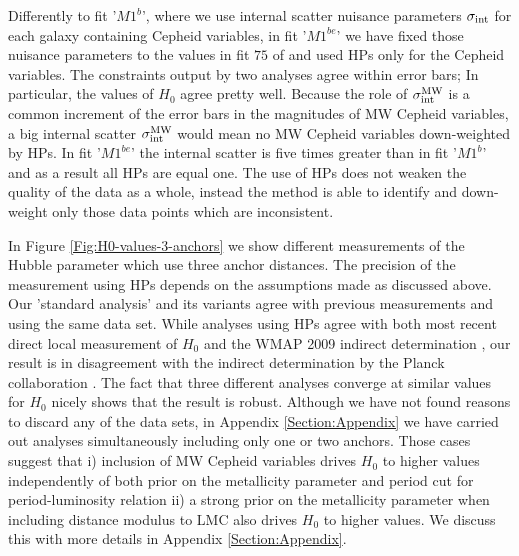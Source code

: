Differently to fit '$M1^b$', where we use internal scatter nuisance parameters $\sigma_{\mathrm{int}}$ for each galaxy containing Cepheid variables, in fit '$M1^{be}$'  we have fixed those nuisance parameters to the values in fit $75$ of \cite{Efstathiou:2013via} and used HPs only for the Cepheid variables. The constraints output by two analyses agree within error bars; In particular, the values of $H_0$ agree pretty well. Because the role of $\sigma_{\mathrm{int}}^{\mathrm{MW}}$ is a common increment of the error bars in the magnitudes of MW Cepheid variables, a big internal scatter $\sigma_{\mathrm{int}}^{\mathrm{MW}}$ would mean no MW Cepheid variables down-weighted by HPs. In fit '$M1^{be}$' the internal scatter is five times greater than in fit '$M1^b$' and as a result all HPs are equal one. The use of HPs does not weaken the quality of the data as a whole, instead the method is able to identify and down-weight only those data points which are inconsistent.

In Figure \ref{Fig:H0-values-3-anchors} we show different measurements of the Hubble parameter which use three anchor distances. The precision of the measurement using HPs depends on the assumptions made as discussed above. Our 'standard analysis' and its variants agree with previous measurements \cite{Riess:2011yx} and \cite{Efstathiou:2013via} using the same data set. While analyses using HPs agree with both most recent direct local measurement of $H_0$ \cite{Riess:2016jrr} and the WMAP 2009 indirect determination \cite{Hinshaw:2012aka}, our result is in disagreement with the indirect determination by the Planck collaboration \cite{Ade:2015xua}. The fact that three different analyses converge at similar values for $H_0$ nicely shows that the result is robust. Although we have not found reasons to discard any of the data sets, in Appendix \ref{Section:Appendix} we have carried out analyses simultaneously including only one or two anchors. Those cases suggest that i) inclusion of MW Cepheid variables drives $H_0$ to higher values independently of both prior on the metallicity parameter and period cut for period-luminosity relation ii) a strong prior on the metallicity parameter when including distance modulus to LMC also drives $H_0$ to higher values. We discuss this with more details in Appendix \ref{Section:Appendix}. 


